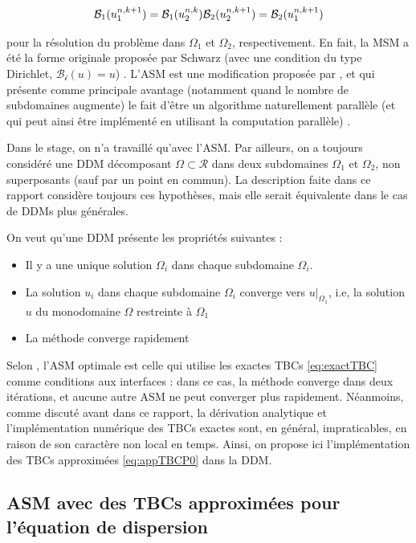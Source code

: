 $$\mathcal{B}_1(u_1^{n,k+1}) = \mathcal{B}_1(u_2^{n,k}) \\ \mathcal{B}_2(u_2^{n,k+1}) = \mathcal{B}_2(u_1^{n,k+1})$$

\noindent pour la résolution du problème dans $\Omega_1$ et $\Omega_2$, respectivement. En fait, la MSM a été la forme originale proposée par Schwarz (avec une condition du type Dirichlet, $\mathcal{B_i}(u) = u$)  \cite{Japhet2003,Lions1990}. L'ASM est une modification proposée par \cite{Lions1988}, et qui présente comme principale avantage (notamment quand le nombre de subdomaines augmente) le fait d'être un algorithme naturellement parallèle (et qui peut ainsi être implémenté en utilisant la computation parallèle) \cite{Lions1988}.

\indent Dans le stage, on n'a travaillé qu'avec l'ASM. Par ailleurs, on a toujours considéré une DDM décomposant $\Omega \subset \mathcal{R}$ dans deux subdomaines $\Omega_1$ et $\Omega_2$, non superposants (sauf par un point en commun). La description faite dans ce rapport considère toujours ces hypothèses, mais elle serait équivalente dans le cas de DDMs plus générales.

\indent On veut qu'une DDM présente les propriétés suivantes :

\begin{itemize}
   	\item Il y a une unique solution $\Omega_i$ dans chaque subdomaine $\Omega_i$.
	\item La solution $u_i$ dans chaque subdomaine $\Omega_i$ converge vers $u|_{\Omega_1}$, i.e, la solution $u$ du monodomaine $\Omega$ restreinte à $\Omega_1$
	\item La méthode converge rapidement
\end{itemize}

\indent Selon \cite{Japhet2013}, l'ASM optimale est celle qui utilise les exactes TBCs \eqref{eq:exactTBC} comme conditions aux interfaces : dans ce cas, la méthode converge dans deux itérations, et aucune autre ASM ne peut converger plus rapidement. Néanmoins, comme discuté avant dans ce rapport, la dérivation analytique et l'implémentation numérique des TBCs exactes sont, en général, impraticables, en raison de son caractère non local en temps. Ainsi, on propose ici l'implémentation des TBCs approximées \eqref{eq:appTBCP0} dans la DDM.

\subsection{ASM avec des TBCs approximées pour l'équation de dispersion}

